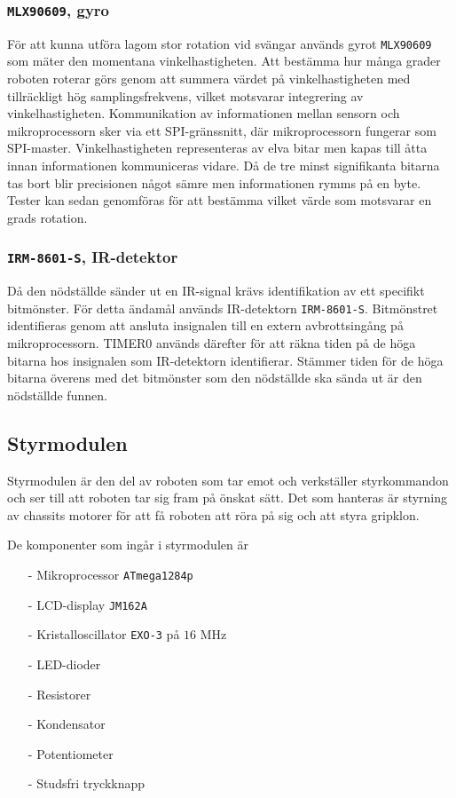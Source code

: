 \documentclass[11pt]{article}
\begin{document}
\begin{flushleft}
\subsubsection{\texttt{MLX90609}, gyro}
För att kunna utföra lagom stor rotation vid svängar används gyrot \verb+MLX90609+ som mäter den momentana vinkelhastigheten. Att bestämma hur många grader roboten roterar görs genom att summera värdet på vinkelhastigheten med tillräckligt hög samplingsfrekvens, vilket motsvarar integrering av vinkelhastigheten. Kommunikation av informationen mellan sensorn och mikroprocessorn sker via ett SPI-gränssnitt, där mikroprocessorn fungerar som SPI-master. Vinkelhastigheten representeras av elva bitar men kapas till åtta innan informationen kommuniceras vidare. Då de tre minst signifikanta bitarna tas bort blir precisionen något sämre men informationen rymms på en byte. Tester kan sedan genomföras för att bestämma vilket värde som motsvarar en grads rotation.  

\subsubsection{\texttt{IRM-8601-S}, IR-detektor}
Då den nödställde sänder ut en IR-signal krävs identifikation av ett specifikt bitmönster. För detta ändamål används IR-detektorn \verb+IRM-8601-S+. Bitmönstret identifieras genom att ansluta insignalen till en extern avbrottsingång på mikroprocessorn. TIMER0 används därefter för att räkna tiden på de höga bitarna hos insignalen som IR-detektorn identifierar. Stämmer tiden för de höga bitarna överens med det bitmönster som den nödställde ska sända ut är den nödställde funnen.

\subsection{Styrmodulen}

Styrmodulen är den del av roboten som tar emot och verkställer styrkommandon och ser till att roboten tar sig fram på önskat sätt. Det som hanteras är styrning av chassits motorer för att få roboten att röra på sig och att styra gripklon. 

De komponenter som ingår i styrmodulen är
\begin{itemize}
  \item[-] Mikroprocessor \verb+ATmega1284p+
  \item[-] LCD-display \verb+JM162A+
  \item[-] Kristalloscillator \verb+EXO-3+ på $16$ MHz
  \item[-] LED-dioder
  \item[-] Resistorer
  \item[-] Kondensator
  \item[-] Potentiometer
  \item[-] Studsfri tryckknapp
\end{itemize}


\end{flushleft}
\end{document}
